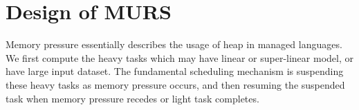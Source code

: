 \section{Design of MURS}
\label{sec:desgin}

Memory pressure essentially describes the usage of heap in managed languages. We first compute the heavy tasks which may have linear or super-linear model, or have large input dataset. The fundamental scheduling mechanism is suspending these heavy tasks as memory pressure occurs, and then resuming the suspended task when memory pressure recedes or light task completes.






